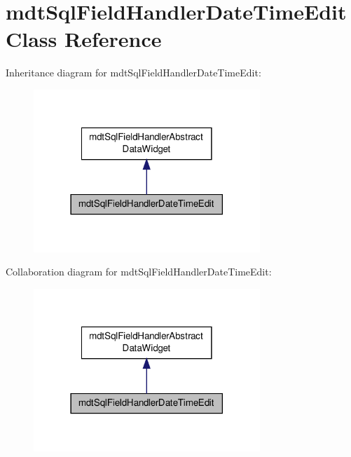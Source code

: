 \hypertarget{classmdt_sql_field_handler_date_time_edit}{\section{mdt\-Sql\-Field\-Handler\-Date\-Time\-Edit Class Reference}
\label{classmdt_sql_field_handler_date_time_edit}
}


Inheritance diagram for mdt\-Sql\-Field\-Handler\-Date\-Time\-Edit\-:
\nopagebreak
\begin{figure}[H]
\begin{center}
\leavevmode
\includegraphics[width=242pt]{classmdt_sql_field_handler_date_time_edit__inherit__graph}
\end{center}
\end{figure}


Collaboration diagram for mdt\-Sql\-Field\-Handler\-Date\-Time\-Edit\-:
\nopagebreak
\begin{figure}[H]
\begin{center}
\leavevmode
\includegraphics[width=242pt]{classmdt_sql_field_handler_date_time_edit__coll__graph}
\end{center}
\end{figure}
